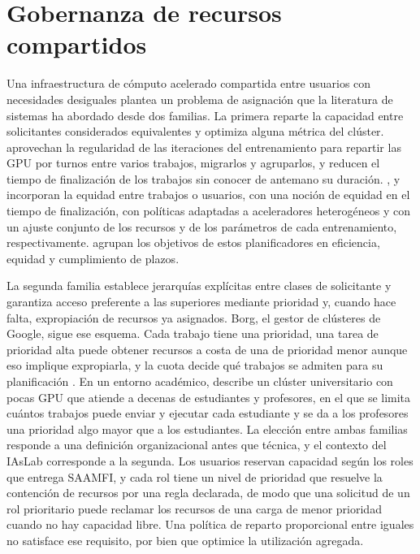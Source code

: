 \section{Gobernanza de recursos compartidos}\label{sec:gobernanza-recursos-compartidos}

Una infraestructura de cómputo acelerado compartida entre usuarios con necesidades desiguales plantea un problema de asignación que la literatura de sistemas ha abordado desde dos familias. La primera reparte la capacidad entre solicitantes considerados equivalentes y optimiza alguna métrica del clúster. \citet{xiao-gandiva-2018} aprovechan la regularidad de las iteraciones del entrenamiento para repartir las GPU por turnos entre varios trabajos, migrarlos y agruparlos, y \citet{gu-tiresias-2019} reducen el tiempo de finalización de los trabajos sin conocer de antemano su duración. \citet{mahajan-themis-2020}, \citet{narayanan-gavel-2020} y \citet{qiao-pollux-2021} incorporan la equidad entre trabajos o usuarios, con una noción de equidad en el tiempo de finalización, con políticas adaptadas a aceleradores heterogéneos y con un ajuste conjunto de los recursos y de los parámetros de cada entrenamiento, respectivamente. \citet{ye-dlschedulingsurvey-2024} agrupan los objetivos de estos planificadores en eficiencia, equidad y cumplimiento de plazos.

La segunda familia establece jerarquías explícitas entre clases de solicitante y garantiza acceso preferente a las superiores mediante prioridad y, cuando hace falta, expropiación de recursos ya asignados. Borg, el gestor de clústeres de Google, sigue ese esquema. Cada trabajo tiene una prioridad, una tarea de prioridad alta puede obtener recursos a costa de una de prioridad menor aunque eso implique expropiarla, y la cuota decide qué trabajos se admiten para su planificación \citep{verma-borg-2015}. En un entorno académico, \citet{george-hpcgpuclassroom-2020} describe un clúster universitario con pocas GPU que atiende a decenas de estudiantes y profesores, en el que se limita cuántos trabajos puede enviar y ejecutar cada estudiante y se da a los profesores una prioridad algo mayor que a los estudiantes. La elección entre ambas familias responde a una definición organizacional antes que técnica, y el contexto del IAsLab corresponde a la segunda. Los usuarios reservan capacidad según los roles que entrega SAAMFI, y cada rol tiene un nivel de prioridad que resuelve la contención de recursos por una regla declarada, de modo que una solicitud de un rol prioritario puede reclamar los recursos de una carga de menor prioridad cuando no hay capacidad libre. Una política de reparto proporcional entre iguales no satisface ese requisito, por bien que optimice la utilización agregada.

